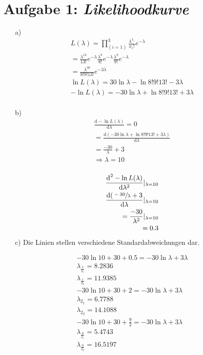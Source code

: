 \section*{Aufgabe 1: \emph{Likelihoodkurve}}
\begin{itemize}
\item[a)]
\begin{align*}
L(\lambda) = \prod^3_(i=1)\frac{\lambda^{x_i}}{x_i!}e^{-\lambda}\\
=\frac{\lambda^{13}}{13!}e^{-\lambda}\frac{\lambda^{8}}{8!}e^{-\lambda}\frac{\lambda^{9}}{9!}e^{-\lambda}\\
=\frac{\lambda^{30}}{8!9!13!}e^{-3\lambda}\\
\ln{L(\lambda)} = 30\ln{\lambda}-\ln{8!9!13!}-3\lambda\\
-\ln{L(\lambda)} = -30\ln{\lambda}+\ln{8!9!13!}+3\lambda\\
\end{align*}

\item[b)]
\begin{align*}
\frac{\text{d}-\ln{L(\lambda)}}{\text{d}\lambda} = 0\\
= \frac{\text{d}(-30\ln{\lambda}+\ln{8!9!13!}+3\lambda)}{\text{d}\lambda}\\
=\frac{-30}{\lambda} + 3\\
\Rightarrow \lambda = 10\\
\end{align*}

\begin{align*}
\frac{\text{d}^2-\ln{L(\lambda)}}{\text{d}\lambda^2}|_{\lambda=10}\\
\frac{\text{d}(\sfrac{-30}{\lambda}+3}{\text{d}\lambda}|_{\lambda=10}\\
=\frac{-30}{\lambda^2}|_{\lambda=10}\\
= 0.3 \\
\end{align*}

\item[c)] Die Linien stellen verschiedene Standardabweichungen dar.

\begin{align*}
-30\ln{10}+30 + 0.5 = -30\ln{\lambda} + 3\lambda \\
\lambda_{\frac{1}{2_1}} = 8.2836\\
\lambda_{\frac{1}{2_2}} = 11.9385\\
-30\ln{10}+30 + 2 = -30\ln{\lambda} + 3\lambda \\
\lambda_{2_1} = 6.7788\\
\lambda_{2_2} = 14.1088\\
-30\ln{10}+30 + \frac{9}{2} = -30\ln{\lambda} + 3\lambda \\
\lambda_{\frac{9}{2_1}} = 5.4743\\
\lambda_{\frac{9}{2_2}} = 16.5197\\
\end{align*}


\end{itemize}

